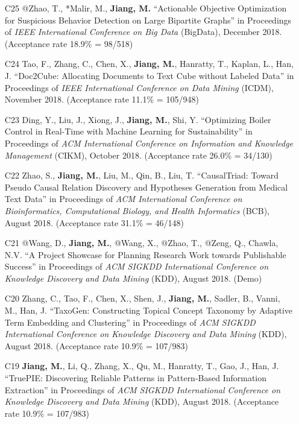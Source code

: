 \documentclass[10pt]{article}
\newenvironment{myindentpar}[1]%
{\begin{list}{}%
         {\setlength{\leftmargin}{#1}}%
         \item[]%
}
{\end{list}}
\newcounter{list}
\begin{document}
\begin{myindentpar}{0.00cm}
\begin{enumerate}[leftmargin=.5cm]
\item[C25] @Zhao, T., *Malir, M., \textbf{Jiang, M.} ``Actionable Objective Optimization for Suspicious Behavior Detection on Large Bipartite Graphs'' in Proceedings of \textit{IEEE International Conference on Big Data} (BigData), December 2018. (Acceptance rate 18.9\% = 98/518)

\item[C24] Tao, F., Zhang, C., Chen, X., \textbf{Jiang, M.}, Hanratty, T., Kaplan, L., Han, J. ``Doc2Cube: Allocating Documents to Text Cube without Labeled Data'' in Proceedings of \textit{IEEE International Conference on Data Mining} (ICDM), November 2018. (Acceptance rate 11.1\% = 105/948)

\item[C23] Ding, Y., Liu, J., Xiong, J., \textbf{Jiang, M.}, Shi, Y. ``Optimizing Boiler Control in Real-Time with Machine Learning for Sustainability'' in Proceedings of \textit{ACM International Conference on Information and Knowledge Management} (CIKM), October 2018. (Acceptance rate 26.0\% = 34/130)

\item[C22] Zhao, S., \textbf{Jiang, M.}, Liu, M., Qin, B., Liu, T. ``CausalTriad: Toward Pseudo Causal Relation Discovery and Hypotheses Generation from Medical Text Data'' in Proceedings of \textit{ACM International Conference on Bioinformatics, Computational Biology, and Health Informatics} (BCB), August 2018. (Acceptance rate 31.1\% = 46/148)

\item[C21] @Wang, D., \textbf{Jiang, M.}, @Wang, X., @Zhao, T., @Zeng, Q., Chawla, N.V. ``A Project Showcase for Planning Research Work towards Publishable Success'' in Proceedings of \textit{ACM SIGKDD International Conference on Knowledge Discovery and Data Mining} (KDD), August 2018. (Demo)

\item[C20] Zhang, C., Tao, F., Chen, X., Shen, J., \textbf{Jiang, M.}, Sadler, B., Vanni, M., Han, J. ``TaxoGen: Constructing Topical Concept Taxonomy by Adaptive Term Embedding and Clustering'' in Proceedings of \textit{ACM SIGKDD International Conference on Knowledge Discovery and Data Mining} (KDD), August 2018. (Acceptance rate 10.9\% = 107/983)

\item[C19] \textbf{Jiang, M.}, Li, Q., Zhang, X., Qu, M., Hanratty, T., Gao, J., Han, J. ``TruePIE: Discovering Reliable Patterns in Pattern-Based Information Extraction'' in Proceedings of \textit{ACM SIGKDD International Conference on Knowledge Discovery and Data Mining} (KDD), August 2018. (Acceptance rate 10.9\% = 107/983)
	

\end{enumerate}
\end{myindentpar}
\end{document}
